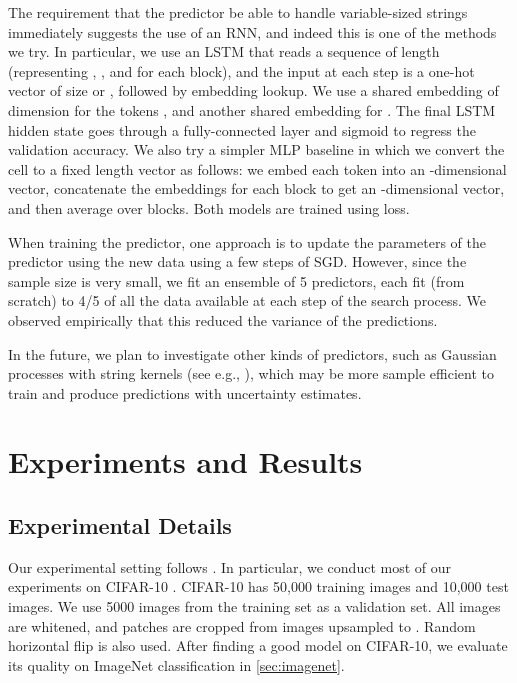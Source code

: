 \documentclass[runningheads]{llncs}
\begin{document}
The requirement that the predictor be able to handle variable-sized strings 
immediately suggests the use of an RNN, and indeed this is one of the methods we try.
In particular, we use an LSTM that reads a sequence of length 
(representing , ,  and  for each block), and the input at each step is a one-hot vector of size  or , followed by embedding lookup.
We use a shared embedding of dimension  for the tokens ,
and another shared embedding for .
The final LSTM hidden state goes through a fully-connected layer and sigmoid to regress the validation accuracy. 
We also try a simpler MLP baseline in which we convert the cell to a fixed length vector as follows:
we embed each token into an -dimensional vector,
concatenate the embeddings for each block to get an -dimensional vector,
and then average over blocks.
Both models are trained using  loss.


When training the predictor,
one approach is to
update the parameters of the predictor using the new data
using a few steps of SGD.
However, since the sample size is very small, we fit
an ensemble of 5 predictors, each fit (from scratch)
to 4/5 of all the data available at each step of the search process.
We observed empirically that this reduced the variance of the predictions.


In the future, we plan to investigate other kinds of predictors,
such as Gaussian processes with string kernels (see e.g., \cite{Baisero2015}),
which may be more sample efficient to train and produce predictions with uncertainty estimates.
 
\section{Experiments and Results}
\label{sec:results}

\subsection{Experimental Details}

Our  experimental setting follows \cite{DBLP:journals/corr/ZophVSL17}.
In particular, we conduct most of our experiments on CIFAR-10 \cite{krizhevsky2009learning}.
CIFAR-10  has 50,000 training images and 10,000 test images.
We use 5000 images from the training set as a validation set.
All images are whitened, and  patches are cropped from images upsampled to .
Random horizontal flip is also used.
After finding a good model on CIFAR-10, we evaluate its quality on
ImageNet classification in \cref{sec:imagenet}.
\end{document}
